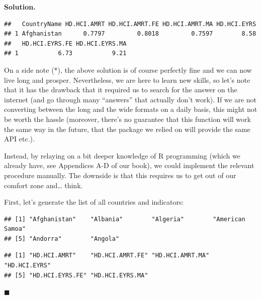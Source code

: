 \documentclass[10pt,b5paper,krantz1]{krantz}
\newenvironment{Shaded}{\begin{snugshade}}{\end{snugshade}}
\newcommand{\DecValTok}[1]{\textcolor[rgb]{0.06,0.06,0.06}{#1}}
\newcommand{\KeywordTok}[1]{\textcolor[rgb]{0.27,0.27,0.27}{\textbf{#1}}}
\newcommand{\NormalTok}[1]{#1}
\newcommand{\OperatorTok}[1]{\textcolor[rgb]{0.43,0.43,0.43}{\textbf{#1}}}
\newcommand{\StringTok}[1]{\textcolor[rgb]{0.5,0.5,0.5}{#1}}
\newenvironment{solution}{%
\bigskip\noindent\textbf{Solution. }%
\it\ignorespaces%
\ignorespaces%
}{\ignorespaces%
\hfill$\blacksquare$%
}
\begin{document}
\begin{solution}
\begin{verbatim}
##   CountryName HD.HCI.AMRT HD.HCI.AMRT.FE HD.HCI.AMRT.MA HD.HCI.EYRS
## 1 Afghanistan      0.7797         0.8018         0.7597        8.58
##   HD.HCI.EYRS.FE HD.HCI.EYRS.MA
## 1           6.73           9.21
\end{verbatim}

\bigskip

On a side note (*), the above solution is of course perfectly fine
and we can now live long and prosper.
Nevertheless, we are here to learn new skills, so let's note
that it has the drawback that it required
us to search for the answer on the internet (and go through many ``answers''
that actually don't work). If we are not converting between the long and the
wide formats on a daily basis, this might not be worth the hassle
(moreover, there's no guarantee that this function will work the same
way in the future, that the package we relied on will provide the same API etc.).

Instead, by relaying on a bit deeper knowledge of R programming
(which we already have, see Appendices A-D of our book),
we could implement the relevant procedure manually. The downside is that
this requires us to get out of our comfort zone and\ldots{} think.

First, let's generate the list of all countries and indicators:

\begin{Shaded}
\end{Shaded}

\begin{verbatim}
## [1] "Afghanistan"    "Albania"        "Algeria"        "American Samoa"
## [5] "Andorra"        "Angola"
\end{verbatim}

\begin{Shaded}
\end{Shaded}

\begin{verbatim}
## [1] "HD.HCI.AMRT"    "HD.HCI.AMRT.FE" "HD.HCI.AMRT.MA" "HD.HCI.EYRS"   
## [5] "HD.HCI.EYRS.FE" "HD.HCI.EYRS.MA"
\end{verbatim}


\end{solution}
\end{document}
